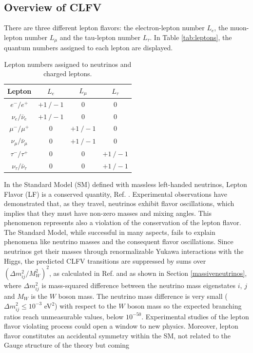 \subsection{Overview of CLFV}
There are three different lepton flavors: the electron-lepton number $L_e$, the muon-lepton number $L_{\mu}$ and the tau-lepton number $L_{\tau}$. In Table \ref{tab:leptons}, the quantum numbers assigned to each lepton are displayed.
 \begin{center}  
\begin{table}[!h]
\centering
\renewcommand{\arraystretch}{1.5}
\begin{tabular}{c c c c}
\hline
Lepton & $L_e$ & $L_{\mu}$ & $L_{\tau}$\\
\hline
$e^-/e^+$ & $+1 \ /-1$ & 0 & 0 \\
$\nu_{e}/\bar{\nu}_{e}$ & $+1 \ /-1$ & 0 & 0 \\
$\mu^-/\mu^+$ & 0 & $+1 \ /-1$ & 0 \\
$\nu_{\mu}/\bar{\nu}_{\mu}$ & 0 & $+1 \ /-1$ & 0 \\
$\tau^-/\tau^+$ & 0 & 0 & $+1 \ /-1$\\
$\nu_{\tau}/\bar{\nu}_{\tau}$ & 0 & 0 & $+1 \ /-1$ \\
\hline
\end{tabular}
\caption{Lepton numbers assigned to neutrinos and charged leptons.}
\end{table}\label{tab:leptons}
\end{center}
In the Standard Model (SM) defined with massless left-handed neutrinos, Lepton Flavor (LF) is a conserved quantity, Ref. \cite{universe8060299}. Experimental observations have demonstrated that, as they travel, neutrinos exhibit flavor oscillations, which implies that they must have non-zero masses and mixing angles. This phenomenon represents also a violation of the conservation of the lepton flavor. The Standard Model, while successful in many aspects, fails to explain phenomena like neutrino masses and the consequent flavor oscillations. Since neutrinos get their masses through renormalizable Yukawa interactions
with the Higgs, the predicted CLFV transitions are suppressed by sums over $(\Delta m^2_{i j}/M^2 _W)^2$, as calculated in Ref. \cite{MARCIANO1977303} and as shown in Section \ref{massiveneutrinos}, where $\Delta m^2_{ij}$ is mass-squared difference between the neutrino mass eigenstates $i$, $j$ and $M_W$ is the $W$ boson mass. The neutrino mass difference is very small ($\Delta m^2 _{i j} \leq 10^{-3}$ eV$^2$) with respect to the $W$ boson mass so the expected branching ratios reach unmeasurable values, below $10^{-50}$. Experimental studies of the lepton flavor violating process could open a window to new physics. Moreover, lepton flavor constitutes an accidental symmetry within the SM, not related to the Gauge structure of the theory but coming

